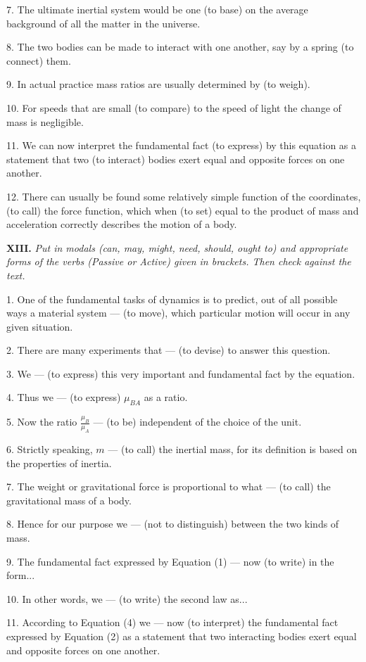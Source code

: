 \documentclass[a4paper]{article}
\newcommand{\ETask}[2]{\medskip\par\textbf{#1.} \textit{#2}\par}
\begin{document}
7. The ultimate inertial system would be one (to base) on the average background of all the matter in the universe.

8. The two bodies can be made to interact with one another, say by a spring (to connect) them.

9. In actual practice mass ratios are usually determined by (to weigh).

10. For speeds that are small (to compare) to the speed of light the change of mass is negligible.

11. We can now interpret the fundamental fact (to express) by this equation as a statement that two (to interact) bodies exert
equal and opposite forces on one another.

12. There can usually be found some relatively simple function of the coordinates, (to call) the force function, which when
(to set) equal to the product of mass and acceleration correctly describes the motion of a body.

\ETask{XIII}{Put in modals (can, may, might, need, should, ought to) and appropriate forms of the verbs (Passive or Active)
given in brackets. Then check against the text.}

1. One of the fundamental tasks of dynamics is to predict, out of all possible ways a material system --- (to move), which
particular motion will occur in any given situation.

2. There are many experiments that --- (to devise) to answer this question.

3. We --- (to express) this very important and fundamental fact by the equation.

4. Thus we --- (to express) $\mu_{BA}$ as a ratio.

5. Now the ratio $\frac{\mu_B}{\mu_A}$ --- (to be) independent of the choice of the unit.

6. Strictly speaking, $m$ --- (to call) the inertial mass, for its definition is based on the properties of inertia.

7. The weight or gravitational force is proportional to what --- (to call) the gravitational mass of a body.

8. Hence for our purpose we --- (not to distinguish) between the two kinds of mass.

9. The fundamental fact expressed by Equation (1) --- now (to write)
in the form...

10. In other words, we --- (to write) the second law as...

11. According to Equation (4) we --- now (to interpret) the fundamental fact expressed by Equation (2) as a statement that
two interacting bodies exert equal and opposite forces on one another.
\end{document}
